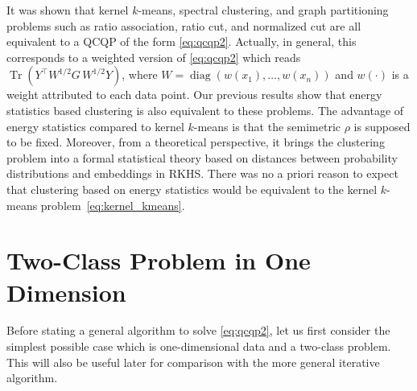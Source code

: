 \documentclass[aps,preprint,nofootinbib,floatfix]{revtex4-1}
\DeclareMathOperator{\diag}{diag}
\DeclareMathOperator{\Tr}{Tr}
\begin{document}
It was shown \cite{Dhillon} that kernel $k$-means, spectral clustering,
and graph partitioning problems such as ratio association, ratio cut, and
normalized cut are all equivalent to a QCQP of the form \eqref{eq:qcqp2}.
Actually, in general, 
this corresponds to a weighted version of \eqref{eq:qcqp2} which reads
$ \Tr \left( Y^\top W^{1/2} G \, W^{1/2} Y \right)$, where 
$W = 
\diag(w(x_1),\dotsc, w(x_n))$ and $w(\cdot)$ is a
weight attributed to each data point. Our previous 
results show that energy statistics
based clustering is also equivalent to these problems. The advantage
of energy statistics compared to kernel $k$-means 
is that the semimetric $\rho$ is supposed to be fixed. Moreover, from a
theoretical perspective, it brings the clustering problem into a formal
statistical theory based on distances between probability distributions
and embeddings in RKHS. There was no a priori reason to expect that clustering
based on energy statistics would be equivalent to the kernel $k$-means
problem~\eqref{eq:kernel_kmeans}.


\section{Two-Class Problem in One Dimension}
\label{sec:twoclass}

Before stating a general algorithm to solve \eqref{eq:qcqp2}, 
let us first consider the simplest possible case which
is one-dimensional data and a two-class problem. This will also 
be useful later
for comparison with the more general iterative algorithm.
\end{document}
